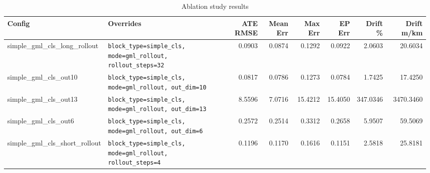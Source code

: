 \begin{table}[ht]
\centering
\caption{Ablation study results}
\label{tab:ablation}
\small
\setlength{\tabcolsep}{4pt}
\begin{tabular}{ll rr rr rr}
\toprule
\textbf{Config} & \textbf{Overrides} &
\textbf{ATE RMSE} & \textbf{Mean Err} &
\textbf{Max Err} & \textbf{EP Err} &
\textbf{Drift \%} & \textbf{Drift m/km} \\
\midrule
simple\_gml\_cls\_long\_rollout & \texttt{block\_type=simple\_cls, mode=gml\_rollout, rollout\_steps=32} & 0.0903 & 0.0874 & 0.1292 & 0.0922 & 2.0603 & 20.6034 \\
simple\_gml\_cls\_out10 & \texttt{block\_type=simple\_cls, mode=gml\_rollout, out\_dim=10} & 0.0817 & 0.0786 & 0.1273 & 0.0784 & 1.7425 & 17.4250 \\
simple\_gml\_cls\_out13 & \texttt{block\_type=simple\_cls, mode=gml\_rollout, out\_dim=13} & 8.5596 & 7.0716 & 15.4212 & 15.4050 & 347.0346 & 3470.3460 \\
simple\_gml\_cls\_out6 & \texttt{block\_type=simple\_cls, mode=gml\_rollout, out\_dim=6} & 0.2572 & 0.2514 & 0.3312 & 0.2658 & 5.9507 & 59.5069 \\
simple\_gml\_cls\_short\_rollout & \texttt{block\_type=simple\_cls, mode=gml\_rollout, rollout\_steps=4} & 0.1196 & 0.1170 & 0.1616 & 0.1151 & 2.5818 & 25.8181 \\
\bottomrule
\end{tabular}
\end{table}
